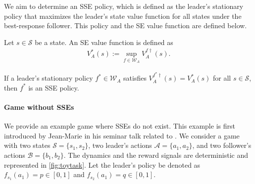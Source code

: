 \documentclass{acml}
\begin{document}
We aim to determine an SSE policy, 
which is defined as the leader's stationary policy that maximizes the leader's state value function for all states under the best-response follower.
This policy and the SE value function are defined below.

\begin{definition}
	Let $s\in\mathcal{S}$ be a state.
	An SE value function is defined as
	\begin{align*}
		V_A^*(s) := \sup_{f\in\mathcal{W}_A} V_A^{f\dag}(s).
	\end{align*}
\end{definition}

\begin{definition}\label{thrm:def_SSEP}
	If a leader's stationary policy $f^*\in\mathcal{W}_A$ satisfies $V_A^{f^*\dag}(s)= V_A^*(s)$ for all $s \in \mathcal{S}$, then $f^*$ is an SSE policy.
\end{definition}

\paragraph{Game without SSEs}
We provide an example game where SSEs do not exist. This example is first introduced by Jean-Marie in his seminar talk \citep{Jean-Marie2022-td} related to \citet{Bucarey2022-ro}.
We consider a game with two states $\mathcal{S} = \{s_1, s_2\}$, two leader's actions $\mathcal{A} = \{a_1, a_2\}$, and two follower's actions $\mathcal{B} = \{b_1, b_2\}$. 
The dynamics and the reward signals are deterministic and represented in \cref{fig:toytask}.
Let the leader's policy be denoted as $f_{s_1}(a_1) = p \in [0, 1]$ and $f_{s_2}(a_1) = q \in [0, 1]$. 
\end{document}
